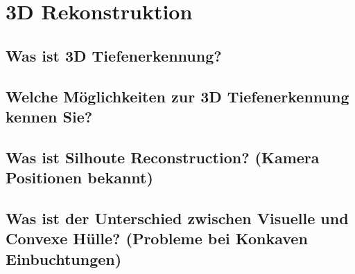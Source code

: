 \section{3D Rekonstruktion}

\subsection{Was ist 3D Tiefenerkennung?}

\subsection{Welche Möglichkeiten zur 3D Tiefenerkennung kennen Sie?}

\subsection{Was ist Silhoute Reconstruction? (Kamera Positionen bekannt)}

\subsection{Was ist der Unterschied zwischen Visuelle und Convexe Hülle? (Probleme bei Konkaven Einbuchtungen)}

